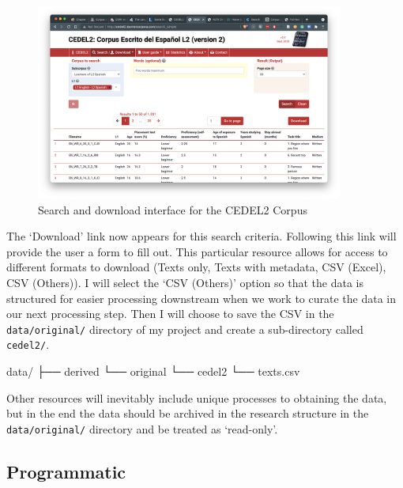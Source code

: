 \documentclass[
  letterpaper,
]{latex/krantz}
\newenvironment{Shaded}{\begin{snugshade}}{\end{snugshade}}
\newcommand{\ExtensionTok}[1]{\textcolor[rgb]{0.00,0.23,0.31}{#1}}
\newcommand{\NormalTok}[1]{\textcolor[rgb]{0.00,0.23,0.31}{#1}}
\begin{document}
\begin{figure}[h]

{\centering \includegraphics[width=0.9\textwidth,height=\textheight]{./figures/acquire-data/ad-cedel2-search-download.png}

}

\caption{\label{fig-ad-show-page-cedel2-2}Search and download interface
for the CEDEL2 Corpus}

\end{figure}

The `Download' link now appears for this search criteria. Following this
link will provide the user a form to fill out. This particular resource
allows for access to different formats to download (Texts only, Texts
with metadata, CSV (Excel), CSV (Others)). I will select the `CSV
(Others)' option so that the data is structured for easier processing
downstream when we work to curate the data in our next processing step.
Then I will choose to save the CSV in the \texttt{data/original/}
directory of my project and create a sub-directory called
\texttt{cedel2/}.

\begin{Shaded}
\begin{Highlighting}[]
\ExtensionTok{data/}
\ExtensionTok{├──}\NormalTok{ derived}
\ExtensionTok{└──}\NormalTok{ original}
    \ExtensionTok{└──}\NormalTok{ cedel2}
       \ExtensionTok{└──}\NormalTok{ texts.csv}
\end{Highlighting}
\end{Shaded}

Other resources will inevitably include unique processes to obtaining
the data, but in the end the data should be archived in the research
structure in the \texttt{data/original/} directory and be treated as
`read-only'.

\hypertarget{programmatic}{%
\subsection{Programmatic}\label{programmatic}}
\end{document}

